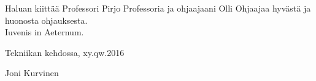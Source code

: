 {\parindent0pt
Haluan kiittää Professori Pirjo 
Professoria ja ohjaajaani Olli Ohjaajaa hyvästä ja 
huonosta ohjauksesta.\\

Iuvenis in Aeternum.}

\vspace{5cm}
Tekniikan kehdossa, xy.qw.2016

\vspace{5mm}
{\hfill Joni Kurvinen \hspace{1cm}}
